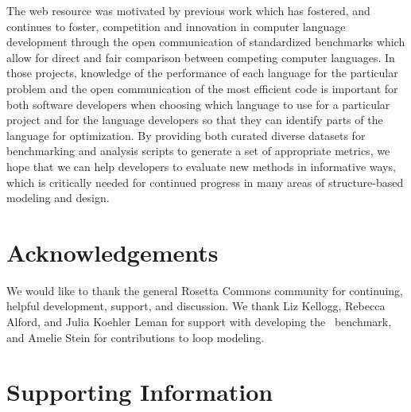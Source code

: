 The web resource was motivated by previous work \cite{bagley_d_computer_2004,calpini_a_great_2003} which has fostered, and continues to foster, competition and innovation in computer language development through the open communication of standardized benchmarks which allow for direct and fair comparison between competing computer languages. In those projects, knowledge of the performance of each language for the particular problem and the open communication of the most efficient code is important for both software developers when choosing which language to use for a particular project and for the language developers so that they can identify parts of the language for optimization. By providing both curated diverse datasets for benchmarking and analysis scripts to generate a set of appropriate metrics, we hope that we can help developers to evaluate new methods in informative ways, which is critically needed for continued progress in many areas of structure-based modeling and design.

\section{Acknowledgements}
We would like to thank the general Rosetta Commons community for continuing, helpful development, support, and discussion. We thank Liz Kellogg, Rebecca Alford, and Julia Koehler Leman for support with developing the \ddg\ benchmark, and Amelie Stein for contributions to loop modeling.

\section{Supporting Information}

